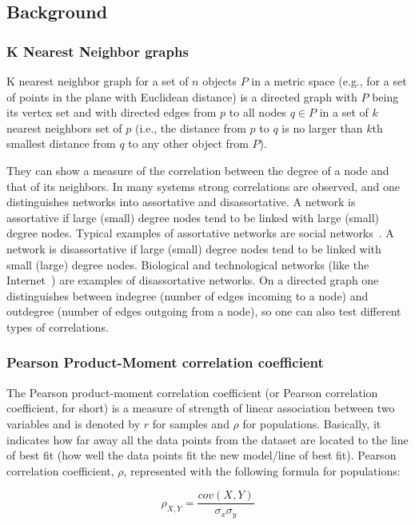 \subsection{Background}
\subsubsection{K Nearest Neighbor graphs}
K nearest neighbor graph for a set of $n$ objects $P$ in a metric space (e.g., for a set of points in the plane with Euclidean distance) is a directed graph with $P$ being its vertex set and with directed edges from $p$ to all nodes $q \in P$ in a set of $k$ nearest neighbors set of $p$ (i.e., the distance from $p$ to $q$ is no larger than $k$th smallest distance from $q$ to any other object from $P$).

They can show a measure of the correlation between the degree of a node and that of its neighbors.
In many systems strong correlations are observed, and one distinguishes networks into assortative and disassortative.
A network is assortative if large (small) degree nodes tend to be linked with large (small) degree nodes.
Typical examples of assortative networks are social networks~\cite{information_or_social_network}.
A network is disassortative if large (small) degree nodes tend to be linked with small (large) degree nodes.
Biological and technological networks (like the Internet~\cite{lecture_sergei_maslov_internet}) are examples of disassortative networks.
On a directed graph one distinguishes between indegree (number of edges incoming to a node) and outdegree (number of edges outgoing from a node), so one can also test different types of correlations.

\subsubsection{Pearson Product-Moment correlation coefficient}

The Pearson product-moment correlation coefficient (or Pearson correlation coefficient, for short) is a measure of strength of linear association between two variables and is denoted by $r$ for samples and $\rho$ for populations.
Basically, it indicates how far away all the data points from the dataset are located to the line of best fit (how well the data points fit the new model/line of best fit).
Pearson correlation coefficient, $\rho$, represented with the following formula for populations:

$$ \rho_{X,Y} = \frac{cov(X,Y)}{\sigma_x \sigma_y}$$

